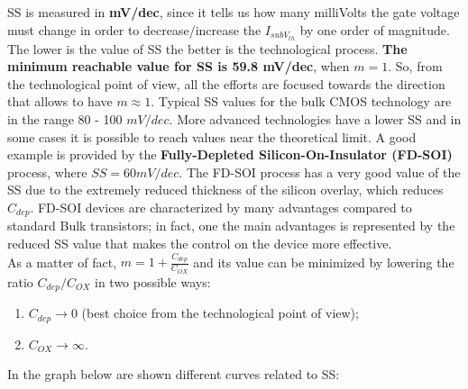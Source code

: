 \documentclass[a4paper, 12pt, twoside, openright]{report}
\begin{document}
{SS is measured in \textbf{mV/dec}, since it tells us how many milliVolts the gate voltage must change in order to decrease/increase the $I_{subV_{th}}$ by one order of magnitude. The lower is the value of SS the better is the technological process. \textbf{The minimum reachable value for SS is 59.8 mV/dec}, when $m = 1$. So, from the technological point of view, all the efforts are focused towards the direction that allows to have $m \approx 1$. Typical SS values for the bulk CMOS technology are in the range 80 - 100 $mV/dec$. More advanced technologies have a lower SS and in some cases it is possible to reach values near the theoretical limit. A good example is provided by the \textbf{Fully-Depleted Silicon-On-Insulator (FD-SOI)} process, where $SS=60mV/dec$. The FD-SOI process has a very good value of the SS due to the extremely reduced thickness of the silicon overlay, which reduces $C_{dep}$. FD-SOI devices are characterized by many advantages compared to standard Bulk transistors; in fact, one the main advantages is represented by the reduced SS value that makes the control on the device more effective.\\
As a matter of fact, $m = 1+ \frac{C_{dep}}{C_{OX}}$ and its value can be minimized by lowering the ratio $C_{dep}/C_{OX}$ in two possible ways:

\begin{enumerate}
\item $C_{dep} \rightarrow 0$ (best choice from the technological point of view);
\item $C_{OX} \rightarrow \infty$.
\end{enumerate}

In the graph below are shown different curves related to SS: %


}
\end{document}
